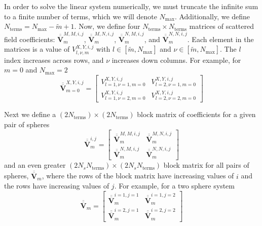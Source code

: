 In order to solve the linear system numerically, we must truncate the infinite sum to a finite number of terms, which we will denote $N_{\mathrm{max}}$. Additionally, we define $N_{\mathrm{terms}} = N_{\mathrm{max}} - \widetilde{m} + 1$. Now, we define four $N_{\mathrm{terms}} \times N_{\mathrm{terms}}$ matrices of scattered field coefficients: $\overline{\overline{\boldsymbol{V}}}_{m}^{M,M,i,j}$, $\overline{\overline{\boldsymbol{V}}}_{m}^{M,N,i,j}$, $\overline{\overline{\boldsymbol{V}}}_{m}^{N,M,i,j}$, and $\overline{\overline{\boldsymbol{V}}}_{m}^{N,N,i,j}$. Each element in the matrices is a value of $V_{l, \nu, m}^{X,Y,i,j}$ with $l \in [\widetilde{m}, N_{\mathrm{max}}]$ and $\nu \in [\widetilde{m}, N_{\mathrm{max}}]$. The $l$ index increases across rows, and $\nu$ increases down columns. For example, for $m=0$ and $N_{\mathrm{max}}=2$
%
\begin{equation}
\overline{\overline{\boldsymbol{V}}}_{m=0}^{X,Y,i,j} = \left[ \begin{array}{ccc}
V_{l=1, \nu=1, m=0}^{X,Y,i,j} & V_{l=2, \nu=1, m=0}^{X,Y,i,j} \\
V_{l=1, \nu=2, m=0}^{X,Y,i,j} & V_{l=2, \nu=2, m=0}^{X,Y,i,j}
\end{array}\right]
\end{equation}

Next we define a $(2 N_{\mathrm{terms}}) \times (2 N_{\mathrm{terms}})$ block matrix of coefficients for a given pair of spheres
\begin{equation}
\overline{\overline{\boldsymbol{V}}}_{m}^{i,j} = \left[ \begin{array}{c|c}
\overline{\overline{\boldsymbol{V}}}_{m}^{M,M,i,j} & \overline{\overline{\boldsymbol{V}}}_{m}^{M,N,i,j} \\ \hline
\overline{\overline{\boldsymbol{V}}}_{m}^{N,M,i,j} & \overline{\overline{\boldsymbol{V}}}_{m}^{N,N,i,j}
\end{array}\right]
\end{equation}
%
and an even greater $(2 N_{s} N_{\mathrm{terms}}) \times (2 N_{s} N_{\mathrm{terms}})$ block matrix for all pairs of spheres, $\overline{\overline{\boldsymbol{V}}}_{m}$, where the rows of the block matrix have increasing values of $i$ and the rows have increasing values of $j$. For example, for a two sphere system
\begin{equation}
\overline{\overline{\boldsymbol{V}}}_{m} = \left[ \begin{array}{c|c}
\overline{\overline{\boldsymbol{V}}}_{m}^{i=1,j=1} & \overline{\overline{\boldsymbol{V}}}_{m}^{i=1,j=2} \\ \hline
\overline{\overline{\boldsymbol{V}}}_{m}^{i=2,j=1} & \overline{\overline{\boldsymbol{V}}}_{m}^{i=2,j=2}
\end{array}\right]
\end{equation}

